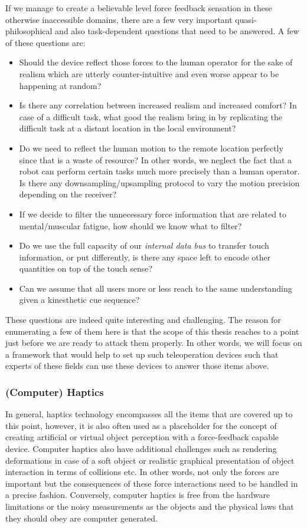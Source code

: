 If we manage to create a believable level force feedback sensation in these otherwise inaccessible domains, there are a few very important quasi-philosophical and also task-dependent questions that need to be answered. A few of these questions are:

\begin{itemize}
	\item Should the device reflect those forces to the human operator for the sake of realism which are utterly counter-intuitive and even worse appear to be happening at random? 
    \item Is there any correlation between increased realism and increased comfort? In case of a difficult task, what good the realism bring in by replicating the difficult task at a distant location in the local environment?
    \item Do we need to reflect the human motion to the remote location perfectly since that is a waste of resource? In other words, we neglect the fact that a robot can perform certain tasks much more precisely than a human operator. Is there any downsampling/upsampling protocol to vary the motion precision depending on the receiver?
    \item If we decide to filter the unnecessary force information that are related to mental/muscular fatigue, how should we know what to filter? 
    \item Do we use the full capacity of our \emph{internal data bus} to transfer touch information, or put differently, is there any space left to encode other quantities on top of the touch sense?
    \item Can we assume that all users more or less reach to the same understanding given a kinesthetic cue sequence?
\end{itemize}

These questions are indeed quite interesting and challenging. The reason for enumerating a few of them here is that the scope of this thesis reaches to a point just before we are ready to attack them properly. In other words, we will focus on a framework that would help to set up such teleoperation devices such that experts of these fields can use these devices to answer those items above.

\subsubsection[Haptics]{(Computer) Haptics}
In general, haptics technology encompasses all the items that are covered up to this point, however, it is also often used as a placeholder for the concept of creating artificial or virtual object perception with a force-feedback capable device. Computer haptics also have additional challenges such as rendering deformations in case of a soft object or realistic graphical presentation of object interaction in terms of collisions etc. In other words, not only the forces are important but the consequences of these force interactions need to be handled in a precise fashion. Conversely, computer haptics is free from the hardware limitations or the noisy measurements as the objects and the physical laws that they should obey are computer generated. 

